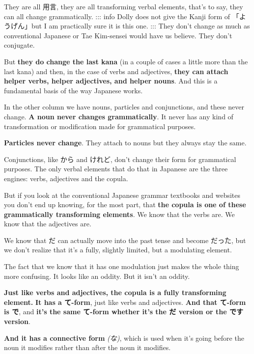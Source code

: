 They are all 用言, they are all transforming verbal elements, that's to say, they can all change grammatically. ::: info Dolly does not give the Kanji form of 「ようげん」but I am practically sure it is this one. ::: They don't change as much as conventional Japanese or Tae Kim-sensei would have us believe. They don't conjugate.

But {\bf they do change the last kana} (in a couple of cases a little more than the last kana) and then, in the case of verbs and adjectives, {\bf they can attach helper verbs, helper adjectives, and helper nouns}. And this is a fundamental basis of the way Japanese works.

In the other column we have nouns, particles and conjunctions, and these never change. {\bf A noun never changes grammatically}. It never has any kind of transformation or modification made for grammatical purposes.

{\bf Particles never change}. They attach to nouns but they always stay the same.

Conjunctions, like から and けれど, don't change their form for grammatical purposes. The only verbal elements that do that in Japanese are the three engines: verbs, adjectives and the copula.

But if you look at the conventional Japanese grammar textbooks and websites you don't end up knowing, for the most part, that {\bf the copula is one of these grammatically transforming elements}. We know that the verbs are. We know that the adjectives are.

We know that だ can actually move into the past tense and become だった, but we don't realize that it's a fully, slightly limited, but a modulating element.

{}

The fact that we know that it has one modulation just makes the whole thing more confusing. It looks like an oddity. But it isn't an oddity.

{\bf Just like verbs and adjectives, the copula is a fully transforming element.} {\bf It has a て-form}, just like verbs and adjectives. {\bf And that て-form is で}, and {\bf it's the same て-form whether it's the だ version or the です version}.

{\bf And it has a connective form} {\em (な)}, which is used when it's going before the noun it modifies rather than after the noun it modifies.

{}

